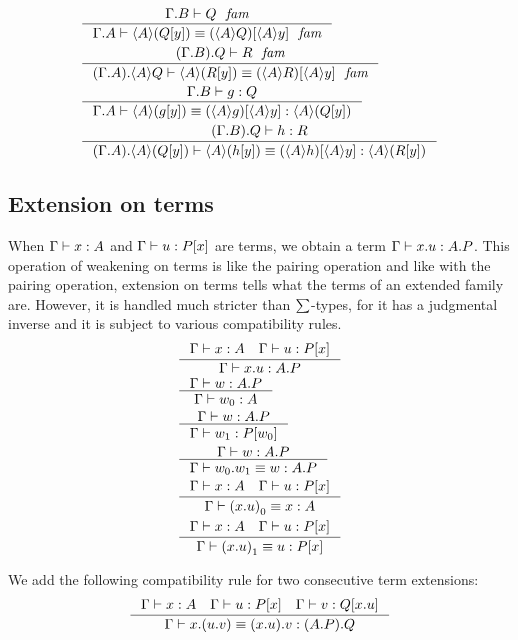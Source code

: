 \begin{align}
& \inference{\jfam{\ctxext{\Gamma}{B}}{Q}}{\jfameq{\ctxext{\Gamma}{A}}{\ctxwk{A}{\subst{y}{Q}}}{\subst{\ctxwk{A}{y}}{\ctxwk{A}{Q}}}}\\
& \inference{\jfam{\ctxext{{\Gamma}{B}}{Q}}{R}}{\jfameq{\ctxext{{\Gamma}{A}}{\ctxwk{A}{Q}}}{\ctxwk{A}{\subst{y}{R}}}{\subst{\ctxwk{A}{y}}{\ctxwk{A}{R}}}}\\
& \inference{\jterm{\ctxext{\Gamma}{B}}{Q}{g}}{\jtermeq{\ctxext{\Gamma}{A}}{\ctxwk{A}{\subst{y}{Q}}}{\ctxwk{A}{\subst{y}{g}}}{\subst{\ctxwk{A}{y}}{\ctxwk{A}{g}}}}\\
& \inference{\jterm{\ctxext{{\Gamma}{B}}{Q}}{R}{h}}{\jtermeq{\ctxext{{\Gamma}{A}}{\ctxwk{A}{\subst{y}{Q}}}}{\ctxwk{A}{\subst{y}{R}}}{\ctxwk{A}{\subst{y}{h}}}{\subst{\ctxwk{A}{y}}{\ctxwk{A}{h}}}}
\end{align}

\subsection{Extension on terms}\label{extension-on-terms}
When $\jterm{\Gamma}{A}{x}$ and $\jterm{\Gamma}{\subst{x}{P}}{u}$ are terms,
we obtain a term $\jterm{\Gamma}{\ctxext{A}{P}}{\ctxext{x}{u}}$. This operation
of weakening on terms is like the pairing operation and like with the pairing
operation, extension on terms tells what the terms of an extended family are. 
However, it is handled
much stricter than $\textstyle\sum$-types, 
for it has a judgmental inverse and it is subject to various compatibility
rules.
\begin{align}
& \inference{\jterm{\Gamma}{A}{x}\quad\jterm{\Gamma}{\subst{x}{P}}{u}}{\jterm{\Gamma}{\ctxext{A}{P}}{\ctxext{x}{u}}}\\
& \inference{\jterm{\Gamma}{\ctxext{A}{P}}{w}}{\jterm{\Gamma}{A}{\pts{w}}}\\
& \inference{\jterm{\Gamma}{\ctxext{A}{P}}{w}}{\jterm{\Gamma}{\subst{\pts{w}}{P}}{\edg{w}}}\\
& \inference{\jterm{\Gamma}{\ctxext{A}{P}}{w}}{\jtermeq{\Gamma}{\ctxext{A}{P}}{\ctxext{\pts{w}}{\edg{w}}}{w}}\\
& \inference{\jterm{\Gamma}{A}{x}\quad\jterm{\Gamma}{\subst{x}{P}}{u}}{\jtermeq{\Gamma}{A}{\pts{(\ctxext{x}{u})}}{x}}\\
& \inference{\jterm{\Gamma}{A}{x}\quad\jterm{\Gamma}{\subst{x}{P}}{u}}{\jtermeq{\Gamma}{\subst{x}{P}}{\edg{(\ctxext{x}{u})}}{u}}
\end{align}

We add the following compatibility rule for two consecutive term extensions:
\begin{equation}
\inference{\jterm{\Gamma}{A}{x}\quad\jterm{\Gamma}{\subst{x}{P}}{u}\quad\jterm{\Gamma}{\subst{\ctxext{x}{u}}{Q}}{v}}
{\jtermeq{\Gamma}{\ctxext{{A}{P}}{Q}}{\ctxext{x}{{u}{v}}}{\ctxext{{x}{u}}{v}}}
\end{equation}


